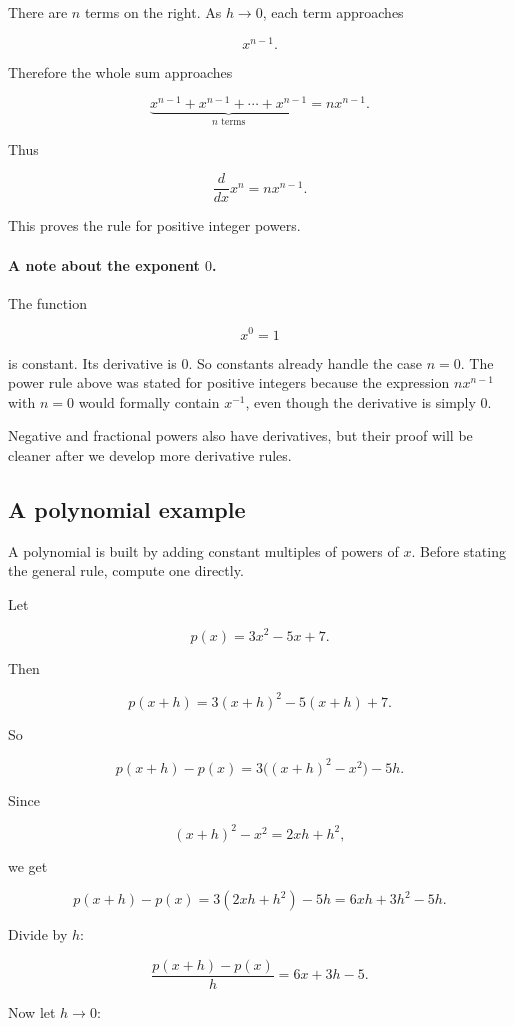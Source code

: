 There are \(n\) terms on the right.  As \(h\to0\), each term approaches

\[
x^{n-1}.
\]

Therefore the whole sum approaches

\[
\underbrace{x^{n-1}+x^{n-1}+\cdots+x^{n-1}}_{n\text{ terms}}
=
nx^{n-1}.
\]

Thus

\[
\frac{d}{dx}x^n=nx^{n-1}.
\]

This proves the rule for positive integer powers.

\paragraph{A note about the exponent \(0\).}
The function

\[
x^0=1
\]

is constant.  Its derivative is \(0\).  So constants already handle the case \(n=0\).  The power rule above was stated for positive integers because the expression \(nx^{n-1}\) with \(n=0\) would formally contain \(x^{-1}\), even though the derivative is simply \(0\).

Negative and fractional powers also have derivatives, but their proof will be cleaner after we develop more derivative rules.

\subsection{A polynomial example}
\label{subsec:polynomial-example-first}

A polynomial is built by adding constant multiples of powers of \(x\).  Before stating the general rule, compute one directly.

Let

\[
p(x)=3x^2-5x+7.
\]

Then

\[
p(x+h)
=
3(x+h)^2-5(x+h)+7.
\]

So

\[
p(x+h)-p(x)
=
3\bigl((x+h)^2-x^2\bigr)-5h.
\]

Since

\[
(x+h)^2-x^2=2xh+h^2,
\]

we get

\[
p(x+h)-p(x)
=
3(2xh+h^2)-5h
=
6xh+3h^2-5h.
\]

Divide by \(h\):

\[
\frac{p(x+h)-p(x)}{h}
=
6x+3h-5.
\]

Now let \(h\to0\):

